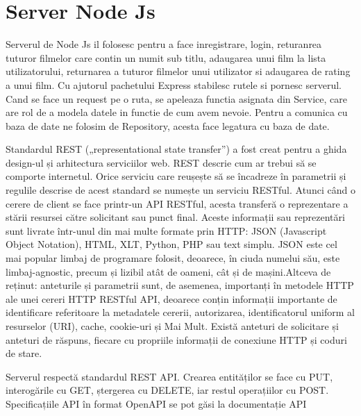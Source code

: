 \section{Server Node Js}
\label{sec:ch5sec1}

\par Serverul de Node Js il folosesc pentru a face inregistrare, login, returanrea tuturor filmelor care contin un numit sub titlu, adaugarea unui film la lista utilizatorului, returnarea a tuturor filmelor unui utilizator si adaugarea de rating a unui film. Cu ajutorul pachetului Express stabilesc rutele si pornesc serverul. Cand se face un request pe o ruta, se apeleaza functia asignata din Service, care are rol de a modela datele in functie de cum avem nevoie. Pentru a comunica cu baza de date ne folosim de Repository, acesta face legatura cu baza de date.
\par Standardul REST („representational state transfer”) a fost creat pentru a ghida design-ul și  arhitectura serviciilor web. REST descrie cum ar trebui să se comporte internetul. Orice serviciu care reușește să se încadreze în parametrii și regulile descrise de acest standard se numește un serviciu RESTful. Atunci când o cerere de client se face printr-un API RESTful, acesta transferă o reprezentare a 
stării resursei către solicitant sau punct final. Aceste informații sau reprezentări sunt livrate într-unul din mai multe formate prin HTTP: JSON (Javascript Object Notation), HTML, XLT, Python, PHP sau text simplu. JSON este cel mai popular limbaj de programare folosit, deoarece, în ciuda numelui său, este limbaj-agnostic, precum și lizibil atât de oameni, cât și de mașini.Altceva de reținut: anteturile și parametrii sunt, de asemenea, importanți în metodele HTTP ale unei cereri HTTP RESTful API, deoarece conțin informații importante de identificare referitoare la metadatele cererii, autorizarea, identificatorul uniform al resurselor (URI), cache, cookie-uri și 
Mai Mult. Există anteturi de solicitare și anteturi de răspuns, fiecare cu propriile informații de  conexiune HTTP și coduri de stare.
\par Serverul respectă standardul REST API. Crearea entităților se face cu PUT, interogările cu GET, ștergerea cu DELETE, iar restul operațiilor cu POST. Specificațiile API în format OpenAPI se pot găsi la documentație API

